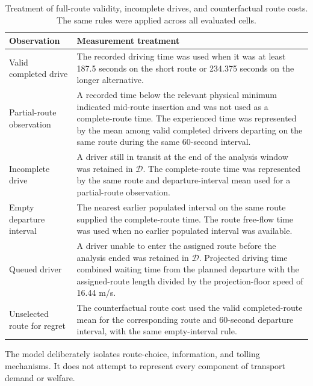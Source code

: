 \documentclass{article}
\begin{document}
\begin{table}[htbp]
\centering
\footnotesize
\setlength{\tabcolsep}{4pt}
\begin{tabular}{@{}p{}p{}@{}}
\toprule
\textbf{Observation} & \textbf{Measurement treatment} \\
\midrule
Valid completed drive & The recorded driving time was used when it was at least 187.5 seconds on the short route or 234.375 seconds on the longer alternative. \\
Partial-route observation & A recorded time below the relevant physical minimum indicated mid-route insertion and was not used as a complete-route time. The experienced time was represented by the mean among valid completed drivers departing on the same route during the same 60-second interval. \\
Incomplete drive & A driver still in transit at the end of the analysis window was retained in $\mathcal D$. The complete-route time was represented by the same route and departure-interval mean used for a partial-route observation. \\
Empty departure interval & The nearest earlier populated interval on the same route supplied the complete-route time. The route free-flow time was used when no earlier populated interval was available. \\
Queued driver & A driver unable to enter the assigned route before the analysis ended was retained in $\mathcal D$. Projected driving time combined waiting time from the planned departure with the assigned-route length divided by the projection-floor speed of 16.44 m/s. \\
Unselected route for regret & The counterfactual route cost used the valid completed-route mean for the corresponding route and 60-second departure interval, with the same empty-interval rule. \\
\bottomrule
\end{tabular}
\caption{Treatment of full-route validity, incomplete drives, and counterfactual route costs. The same rules were applied across all evaluated cells.}
\label{tab:measurement-procedures}
\end{table}

The model deliberately isolates route-choice, information, and tolling mechanisms. It does not attempt to represent every component of transport demand or welfare.
\end{document}
